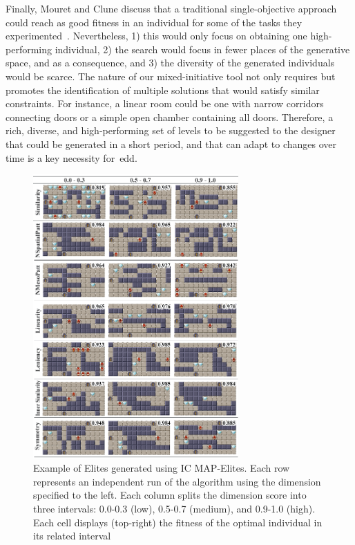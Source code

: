 Finally, Mouret and Clune discuss that a traditional single-objective approach could reach as good fitness in an individual for some of the tasks they experimented~\cite{Mouret2015}. Nevertheless, 1) this would only focus on obtaining one high-performing individual, 2) the search would focus in fewer places of the generative space, and as a consequence, and 3) the diversity of the generated individuals would be scarce. The nature of our mixed-initiative tool not only requires but promotes the identification of multiple solutions that would satisfy similar constraints. For instance, a linear room could be one with narrow corridors connecting doors or a simple open chamber containing all doors. Therefore, a rich, diverse, and high-performing set of levels to be suggested to the designer that could be generated in a short period, and that can adapt to changes over time is a key necessity for~\acrshort{edd}. 

\begin{figure}[!ht]
\centerline{\includegraphics[width=0.7\textwidth]{figures/ICMAPE-figs/figure-all-dimensions-final.png}}
\caption{Example of Elites generated using IC MAP-Elites. Each row represents an independent run of the algorithm using the dimension specified to the left. Each column splits the dimension score into three intervals: 0.0-0.3 (low), 0.5-0.7 (medium), and 0.9-1.0 (high). Each cell displays (top-right) the fitness of the optimal individual in its related interval} \label{fig:dimension-examples}
\end{figure}

